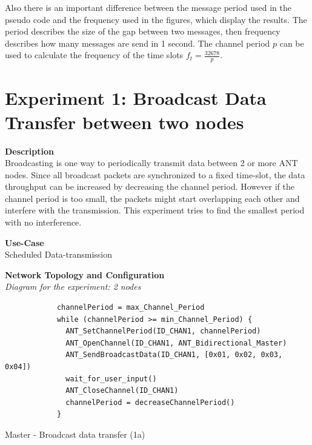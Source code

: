 Also there is an important difference between the message period used in the pseudo code and the frequency used in the figures, which display the results. The period describes the size of the gap between two messages, then frequency describes how many messages are send in 1 second. The channel period $p$ can be used to calculate the frequency of the time slots $f_t = \frac{32678}{p}$.  

\newpage


\section{Experiment 1: Broadcast Data Transfer between two nodes}
\begin{description} 
	\item{\textbf{Description}} \hfill \\ Broadcasting is one way to periodically transmit data between 2 or more ANT nodes. Since all broadcast packets are synchronized to a fixed time-slot, the data throughput can be increased by decreasing the channel period. However if the channel period is too small, the packets might start overlapping each other and interfere with the transmission. This experiment tries to find the smallest period with no interference.
	\item{\textbf{Use-Case}} \hfill \\ Scheduled Data-transmission	
	\item{\textbf{Network Topology and Configuration}} \hfill \\ \textit{Diagram for the experiment:  2 nodes} \\
		\begin{code}[h]
			\begin{verbatim}
			channelPeriod = max_Channel_Period
			while (channelPeriod >= min_Channel_Period) {
			  ANT_SetChannelPeriod(ID_CHAN1, channelPeriod)
			  ANT_OpenChannel(ID_CHAN1, ANT_Bidirectional_Master)
			  ANT_SendBroadcastData(ID_CHAN1, [0x01, 0x02, 0x03, 0x04])
			  wait_for_user_input()
			  ANT_CloseChannel(ID_CHAN1)
			  channelPeriod = decreaseChannelPeriod()
			}
			\end{verbatim}
			\caption{Master - Broadcast data transfer (1a)}\label{lst:mExp1}
		\end{code}
		

\end{description}
